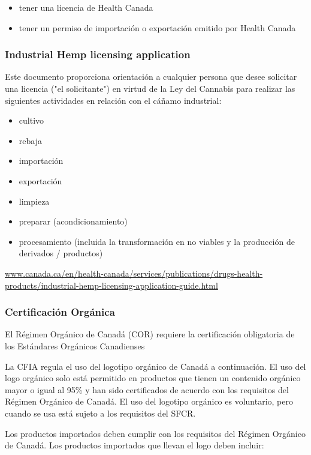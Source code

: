 \documentclass{article}
\begin{document}
\begin{itemize}
	\item tener una licencia de Health Canada
	\item tener un permiso de importación o exportación emitido por Health Canada
\end{itemize}

\subsubsection{Industrial Hemp licensing application}

Este documento proporciona orientación a cualquier persona que desee solicitar una licencia ("el solicitante") en virtud de la Ley del Cannabis para realizar las siguientes actividades en relación con el cáñamo industrial:

\begin{itemize}
	\item cultivo
	\item rebaja
	\item importación
	\item exportación
	\item limpieza
	\item preparar (acondicionamiento)
	\item procesamiento (incluida la transformación en no viables y la producción de derivados / productos)
\end{itemize}

\url{www.canada.ca/en/health-canada/services/publications/drugs-health-products/industrial-hemp-licensing-application-guide.html}

\subsubsection{Certificación Orgánica}

El Régimen Orgánico de Canadá (COR) requiere la certificación obligatoria de los Estándares Orgánicos Canadienses

La CFIA regula el uso del logotipo orgánico de Canadá a continuación. El uso del logo orgánico solo está permitido en productos que tienen un contenido orgánico mayor o igual al 95\% y han sido certificados de acuerdo con los requisitos del Régimen Orgánico de Canadá. El uso del logotipo orgánico es voluntario, pero cuando se usa está sujeto a los requisitos del SFCR.

Los productos importados deben cumplir con los requisitos del Régimen Orgánico de Canadá. Los productos importados que llevan el logo deben incluir:
\end{document}
